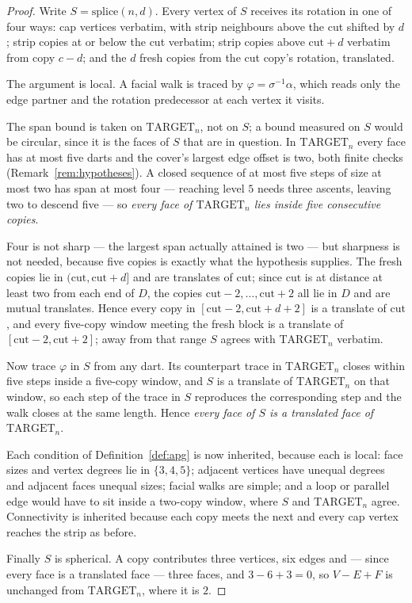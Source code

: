 \documentclass{baustms}
\theoremstyle{cupthm}
\theoremstyle{cupdefn}
\theoremstyle{cuprem}
\begin{document}
\begin{proof}
Write $S = \mathrm{splice}(n,d)$. Every vertex of $S$ receives its rotation in
one of four ways: cap vertices verbatim, with strip neighbours above the cut
shifted by $d$; strip copies at or below the cut verbatim; strip copies above
$\mathrm{cut}+d$ verbatim from copy $c-d$; and the $d$ fresh copies from the cut
copy's rotation, translated.

The argument is local. A facial walk is traced by
$\varphi = \sigma^{-1}\alpha$, which reads only the edge partner and the
rotation predecessor at each vertex it visits.

The span bound is taken on $\mathrm{TARGET}_n$, not on $S$; a bound measured on
$S$ would be circular, since it is the faces of $S$ that are in question. In
$\mathrm{TARGET}_n$ every face has at most five darts and the cover's largest
edge offset is two, both finite checks (Remark~\ref{rem:hypotheses}). A closed
sequence of at most five steps of size at most two has span at most four ---
reaching level $5$ needs three ascents, leaving two to descend five --- so
\emph{every face of $\mathrm{TARGET}_n$ lies inside five consecutive copies}.

Four is not sharp --- the largest span actually attained is two --- but
sharpness is not needed, because five copies is exactly what the hypothesis
supplies. The
fresh copies lie in $(\mathrm{cut}, \mathrm{cut}+d]$ and are translates of
$\mathrm{cut}$; since $\mathrm{cut}$ is at distance at least two from each end
of $D$, the copies $\mathrm{cut}-2,\dots,\mathrm{cut}+2$ all lie in $D$ and are
mutual translates. Hence every copy in $[\mathrm{cut}-2, \mathrm{cut}+d+2]$ is a
translate of $\mathrm{cut}$, and every five-copy window meeting the fresh block
is a translate of $[\mathrm{cut}-2,\mathrm{cut}+2]$; away from that range $S$
agrees with $\mathrm{TARGET}_n$ verbatim.

Now trace $\varphi$ in $S$ from any dart. Its counterpart trace in
$\mathrm{TARGET}_n$ closes within five steps inside a five-copy window, and $S$
is a translate of $\mathrm{TARGET}_n$ on that window, so each step of the trace
in $S$ reproduces the corresponding step and the walk closes at the same length.
Hence \emph{every face of $S$ is a translated face of $\mathrm{TARGET}_n$}.

Each condition of Definition~\ref{def:apg} is now inherited, because each is
local: face sizes and vertex degrees lie in $\{3,4,5\}$; adjacent vertices have
unequal degrees and adjacent faces unequal sizes; facial walks are simple; and a
loop or parallel edge would have to sit inside a two-copy window, where $S$ and
$\mathrm{TARGET}_n$ agree. Connectivity is inherited because each copy meets the
next and every cap vertex reaches the strip as before.

Finally $S$ is spherical. A copy contributes three vertices, six edges and ---
since every face is a translated face --- three faces, and $3-6+3=0$, so
$V-E+F$ is unchanged from $\mathrm{TARGET}_n$, where it is $2$.
\end{proof}
\end{document}
